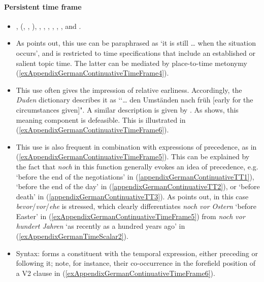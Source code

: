 \paragraph{Persistent time frame}\label{appendixGermanContinuativeTT}
\begin{itemize}
	\item \textcite[s.v. \textit{noch}]{DWDS}, \citeauthor{Beck2016} (\citeyear{Beck2016},  \citeyear{Beck2019}, \citeyear{Beck2020}), \textcite[s.v. \textit{noch}]{Duden}, \textcite[185–186]{Helbig1994}, \textcite{Koenig1977}, \textcite[177]{KoenigEtAl1993}, \textcite{Loebner1989}, \textcite[623–624]{MetrichFaucher2009}, \textcite{Shetter1966} and \textcite{Vaelikangas1982}. 
	\item As \textcite{Loebner1989} points out, this use can be paraphrased as \lq it is still … when the situation occurs', and is restricted to time specifications that include an established or salient topic time. The latter can be mediated by place-to-time metonymy (\ref{exAppendixGermanContinuativeTimeFrame4}).
	\item This use often gives the impression of relative earliness. Accordingly, the \textit{Duden} dictionary \parencite[s.v. \textit{noch}]{Duden} describes it as  \lq\lq … den Umständen nach früh [early for the circumstances given]". A similar description is given by \textcite[185]{Helbig1994}. As \textcite{Beck2020} shows, this meaning component is defeasible. This is illustrated in (\ref{exAppendixGermanContinuativeTimeFrame6}).
	\item This use is also frequent in combination with expressions of precedence, as in (\ref{exAppendixGermanContinuativeTimeFrame5}). This can be explained by the fact that \textit{noch} in this function generally evokes an idea of precedence, e.g. \lq before the end of the negotiations' in (\ref{appendixGermanContinuativeTT1}), \lq before the end of the day' in (\ref{appendixGermanContinuativeTT2}), or \lq before death' in (\ref{appendixGermanContinuativeTT3}). As \textcite{Shetter1966} points out, in this case \textit{bevor}/\textit{vor}/\textit{ehe} is stressed, which clearly differentiates \textit{noch vor Ostern} \lq before Easter' in (\ref{exAppendixGermanContinuativeTimeFrame5}) from \textit{noch vor hundert Jahren} \lq as recently as a hundred years ago' in (\ref{exAppendixGermanTimeScalar2}).
	\item Syntax: forms a constituent with the temporal expression, either preceding or following it; note, for instance, their co-occurrence in the forefield position of a V2 clause in (\ref{exAppendixGermanContinuativeTimeFrame6}).
\end{itemize}

